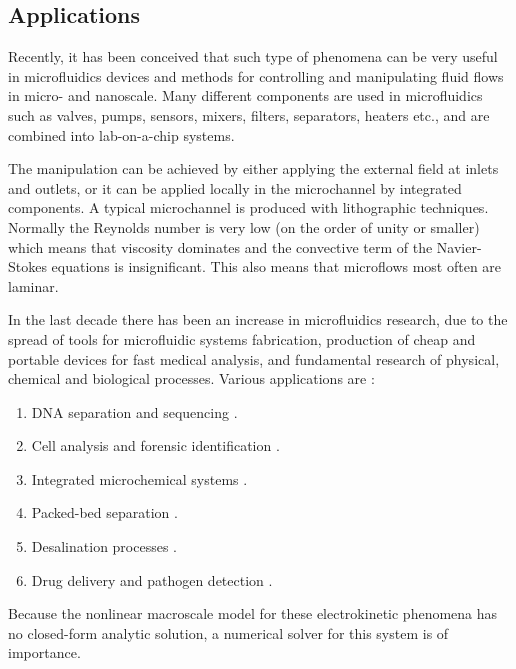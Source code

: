 \documentclass[MSc,beforeExam]{iitcsthesis}
\begin{document}
\subsection{Applications}

Recently, it has been conceived that such type of phenomena
can be very useful in microfluidics
devices and methods for controlling and manipulating fluid flows in micro- and nanoscale. 
Many different components are used in microfluidics such as valves, pumps, sensors, mixers, 
filters, separators, heaters etc., and are combined into lab-on-a-chip systems.

The manipulation can be achieved by either applying the external field at inlets and outlets, or it can be applied locally in the microchannel by integrated components.
A typical microchannel is produced with lithographic techniques. Normally the Reynolds
number is very low (on the order of unity or smaller) which means that viscosity dominates
and the convective term of the Navier-Stokes equations is insignificant. This also means that
microflows most often are laminar.

In the last decade there has been an increase in microfluidics research, 
due to the spread of tools for microfluidic systems fabrication, 
production of cheap and portable devices for fast medical analysis, 
and fundamental research of physical, chemical and biological processes.
Various applications are \cite{whitesides2006origins, erickson2004integrated, squires2005microfluidics, hardt2007microfluidic}:
\begin{enumerate}
\item DNA separation and sequencing \cite{wainright2003preconcentration}.
\item Cell analysis and forensic identification \cite{wu2004chemical, weinberger1993practical, horsman2007forensic}.
\item Integrated microchemical systems \cite{kothare2006dynamics}.
\item Packed-bed separation \cite{leinweber2004, losey2001microfabricated}.
\item Desalination processes \cite{kim2010direct}.
\item Drug delivery and pathogen detection \cite{santini2000microchips}.
\end{enumerate}

Because the nonlinear macroscale model for these electrokinetic
phenomena has no closed-form analytic solution, a numerical
solver for this system is of importance.
\end{document}
